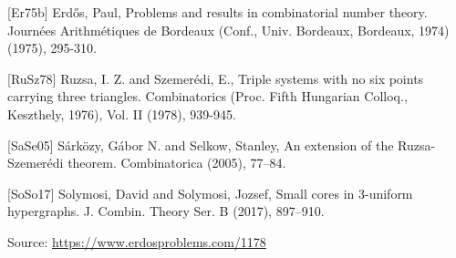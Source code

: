 \documentclass{article}
\begin{document}
 [Er75b] Erd\H{o}s, Paul, Problems and results in combinatorial number theory. Journ\'{e}es Arithm\'{e}tiques de Bordeaux (Conf., Univ. Bordeaux, Bordeaux, 1974) (1975), 295-310.
 
 [RuSz78] Ruzsa, I. Z. and Szemer\'{e}di, E., Triple systems with no six points carrying three triangles. Combinatorics (Proc. Fifth Hungarian Colloq.,
Keszthely, 1976), Vol. II (1978), 939-945.
 
 [SaSe05] S\'{a}rk\"ozy, G\'{a}bor N. and Selkow, Stanley, An extension of the {R}uzsa-Szemer\'edi theorem. Combinatorica (2005), 77--84.
 
 [SoSo17] Solymosi, David and Solymosi, Jozsef, Small cores in 3-uniform hypergraphs. J. Combin. Theory Ser. B (2017), 897--910.

\bigskip
\noindent\small{Source: \url{https://www.erdosproblems.com/1178}}
\end{document}

